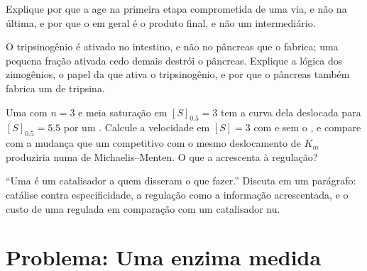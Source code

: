 \begin{exercise}[$\star\star$]\label{exo:b1:enzymes:9}
Explique por que a  age na primeira etapa
comprometida de uma via, e não na última, e por que o  em geral
é o produto final, e não um intermediário.
\end{exercise}

\begin{exercise}[$\star\star\star$]\label{exo:b1:enzymes:10}
O tripsinogênio é ativado no intestino, e não no pâncreas que o
fabrica; uma pequena fração ativada cedo demais destrói o pâncreas.
Explique a lógica dos zimogênios, o papel da  que ativa o
tripsinogênio, e por que o pâncreas também fabrica um  de
tripsina.
\end{exercise}

\begin{exercise}[$\star\star\star$]\label{exo:b1:enzymes:11}
Uma  com $n = 3$ e meia saturação em $[S]_{0.5}
= 3$ tem a curva dela deslocada para $[S]_{0.5} = 5.5$ por um .
Calcule a velocidade em $[S] = 3$ com e sem o , e compare com a
mudança que um  competitivo com o mesmo deslocamento de $K_m$
produziria numa  de Michaelis--Menten. O que a 
acrescenta à regulação?
\end{exercise}

\begin{exercise}[$\star\star\star$]\label{exo:b1:enzymes:12}
``Uma  é um catalisador a quem disseram o que fazer.'' Discuta em
um parágrafo: catálise contra especificidade, a regulação como a
informação acrescentada, e o custo de uma  regulada em comparação
com um catalisador nu.
\end{exercise}

\section{Problema: Uma enzima medida}

